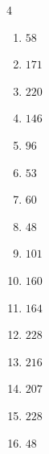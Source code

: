 \begin{multicols}{4}
\begin{enumerate}
  \item $58$


  \item $171$


  \item $220$


  \item $146$


\columnbreak %

  \item $96$


  \item $53$


  \item $60$


  \item $48$


  \item $101$


  \item $160$


  \item $164$


  \item $228$


  \item $216$


  \item $207$


  \item $228$


  \item $48$


\end{enumerate}
\end{multicols}
